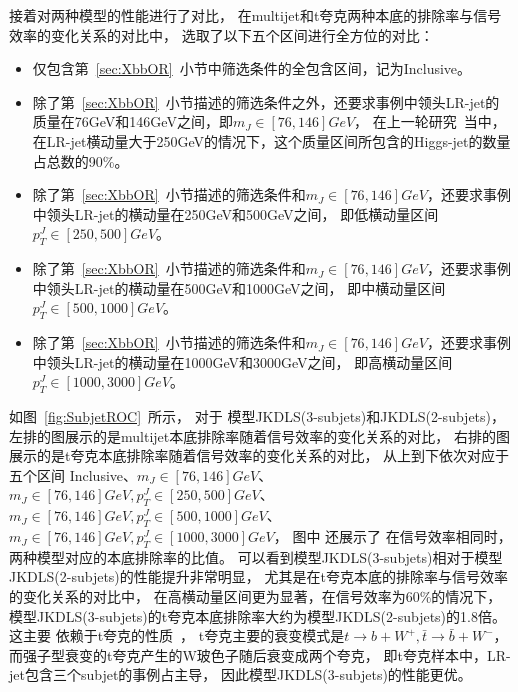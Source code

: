接着对两种模型的性能进行了对比，
在multijet和t夸克两种本底的排除率与信号效率的变化关系的对比中，
选取了以下五个区间进行全方位的对比：
\begin{itemize}
       \item 仅包含第~\ref{sec:XbbOR}~小节中筛选条件的全包含区间，记为Inclusive。
       \item 除了第~\ref{sec:XbbOR}~小节描述的筛选条件之外，还要求事例中领头LR-jet的质量在76GeV和146GeV之间，即$m_{J}\in[76,146]GeV$， 
       在上一轮研究~\cite{TAGGING5}当中，在LR-jet横动量大于250GeV的情况下，这个质量区间所包含的Higgs-jet的数量占总数的90\%。
       \item 除了第~\ref{sec:XbbOR}~小节描述的筛选条件和$m_{J}\in [76,146]GeV$，还要求事例中领头LR-jet的横动量在250GeV和500GeV之间，
       即低横动量区间$p_{T}^{J}\in [250,500]GeV$。
       \item 除了第~\ref{sec:XbbOR}~小节描述的筛选条件和$m_{J}\in [76,146]GeV$，还要求事例中领头LR-jet的横动量在500GeV和1000GeV之间，
       即中横动量区间$p_{T}^{J}\in [500,1000]GeV$。
       \item 除了第~\ref{sec:XbbOR}~小节描述的筛选条件和$m_{J}\in [76,146]GeV$，还要求事例中领头LR-jet的横动量在1000GeV和3000GeV之间，
       即高横动量区间$p_{T}^{J}\in [1000,3000]GeV$。
\end{itemize}
如图~\ref{fig:SubjetROC}~所示，
对于
模型JKDLS(3-subjets)和JKDLS(2-subjets)，
左排的图展示的是multijet本底排除率随着信号效率的变化关系的对比，
右排的图展示的是t夸克本底排除率随着信号效率的变化关系的对比，
从上到下依次对应于五个区间
Inclusive、$m_{J}\in [76,146]GeV$、
$m_{J}\in [76,146]GeV, p_{T}^{J}\in [250,500]GeV$、
$m_{J}\in [76,146]GeV, p_{T}^{J}\in [500,1000]GeV$、
$m_{J}\in [76,146]GeV, p_{T}^{J}\in [1000,3000]GeV$，
图中
还展示了
在信号效率相同时，两种模型对应的本底排除率的比值。
可以看到模型JKDLS(3-subjets)相对于模型JKDLS(2-subjets)的性能提升非常明显，
尤其是在t夸克本底的排除率与信号效率的变化关系的对比中，
在高横动量区间更为显著，在信号效率为60\%的情况下，
模型JKDLS(3-subjets)的t夸克本底排除率大约为模型JKDLS(2-subjets)的1.8倍。
这主要
依赖于t夸克的性质~\cite{PDG}，
t夸克主要的衰变模式是$t\to b+W^+, \bar{t}\to \bar{b}+W^-$，
而强子型衰变的t夸克产生的W玻色子随后衰变成两个夸克，
即t夸克样本中，LR-jet包含三个subjet的事例占主导，
因此模型JKDLS(3-subjets)的性能更优。


